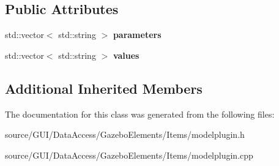 \subsection*{Public Attributes}
\begin{DoxyCompactItemize}
\item 
std\+::vector$<$ std\+::string $>$ {\bfseries parameters}\label{class_model_plugin_a46b707589405a3a97abcdde56ad1e8b9}

\item 
std\+::vector$<$ std\+::string $>$ {\bfseries values}\label{class_model_plugin_ab00b09772b367a14aa9b20eacfa57c51}

\end{DoxyCompactItemize}
\subsection*{Additional Inherited Members}


The documentation for this class was generated from the following files\+:\begin{DoxyCompactItemize}
\item 
source/\+G\+U\+I/\+Data\+Access/\+Gazebo\+Elements/\+Items/modelplugin.\+h\item 
source/\+G\+U\+I/\+Data\+Access/\+Gazebo\+Elements/\+Items/modelplugin.\+cpp\end{DoxyCompactItemize}
